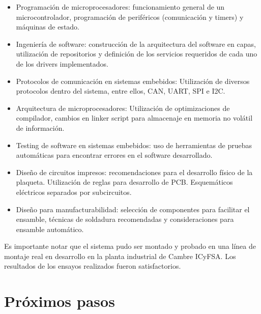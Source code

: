 \begin{itemize}
	\item Programación de microprocesadores: funcionamiento general de un microcontrolador, programación de periféricos (comunicación y timers) y máquinas de estado.
	\item Ingeniería de software: construcción de la arquitectura del software en capas, utilización de repositorios y definición de los servicios requeridos de cada uno de los drivers implementados.
	\item Protocolos de comunicación en sistemas embebidos: Utilización de diversos protocolos dentro del sistema, entre ellos, CAN, UART, SPI e I2C.
	\item Arquitectura de microprocesadores: Utilización de optimizaciones de compilador, cambios en linker script para almacenaje en memoria no volátil de información.
	\item Testing de software en sistemas embebidos: uso de herramientas de pruebas automáticas para encontrar errores en el software desarrollado.
	\item Diseño de circuitos impresos: recomendaciones para el desarrollo físico de la plaqueta. Utilización de reglas para desarrollo de PCB. Esquemáticos eléctricos separados por subcircuitos.
	\item Diseño para manufacturabilidad: selección de componentes para facilitar el ensamble, técnicas de soldadura recomendadas y consideraciones para ensamble automático.
\end{itemize}

Es importante notar que el sistema pudo ser montado y probado en una línea de montaje real en desarrollo en la planta industrial de Cambre ICyFSA. Los resultados de los ensayos realizados fueron satisfactorios.

%

\section{Próximos pasos}

